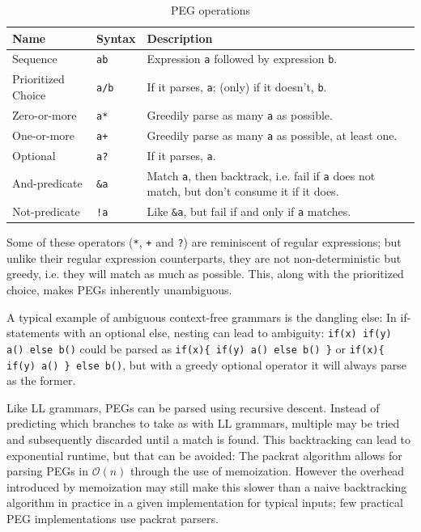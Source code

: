 			\begin{table}
			\begin{center}
			\begin{tabular}{ l l p{10cm} }
			\toprule
			Name               & Syntax          & Description \\
			\midrule
			Sequence           & \lstinline$ab$  & Expression \lstinline$a$ followed by expression \lstinline$b$. \\
			Prioritized Choice & \lstinline$a/b$ & If it parses, \lstinline$a$; (only) if it doesn't, \lstinline$b$. \\
			Zero-or-more       & \lstinline$a*$  & Greedily parse as many \lstinline$a$ as possible. \\
			One-or-more        & \lstinline$a+$  & Greedily parse as many \lstinline$a$ as possible, at least one. \\
			Optional           & \lstinline$a?$  & If it parses, \lstinline$a$. \\
			And-predicate      & \lstinline$&a$  & Match \lstinline$a$, then backtrack, i.e. fail if \lstinline$a$ does not match, but don't consume it if it does. \\
			Not-predicate      & \lstinline$!a$  & Like \lstinline$&a$, but fail if and only if \lstinline$a$ matches. \\
			\bottomrule
			\end{tabular}
			\caption{PEG operations}\label{tab:peg_ops}
			\end{center}
			\end{table}
			
			Some of these operators (\lstinline$*$, \lstinline$+$ and \lstinline$?$) are reminiscent of regular expressions; but unlike their regular expression counterparts, they are not non-deterministic but greedy, i.e. they will match as much as possible. This, along with the prioritized choice, makes PEGs inherently unambiguous.
			
			A typical example of ambiguous context-free grammars is the dangling else: In if-statements with an optional else, nesting can lead to ambiguity: \lstinline$if(x) if(y) a() else b()$ could be parsed as \lstinline$if(x){ if(y) a() else b() }$ or \lstinline$if(x){ if(y) a() } else b()$, but with a greedy optional operator it will always parse as the former.
			
			Like LL grammars, PEGs can be parsed using recursive descent. Instead of predicting which branches to take as with LL grammars, multiple may be tried and subsequently discarded until a match is found. This backtracking can lead to exponential runtime, but that can be avoided: The packrat algorithm\cite{packrat} allows for parsing PEGs in $\mathcal{O}(n)$ through the use of memoization. However the overhead introduced by memoization may still make this slower than a naive backtracking algorithm in practice in a given implementation for typical inputs; few practical PEG implementations use packrat parsers.
			

